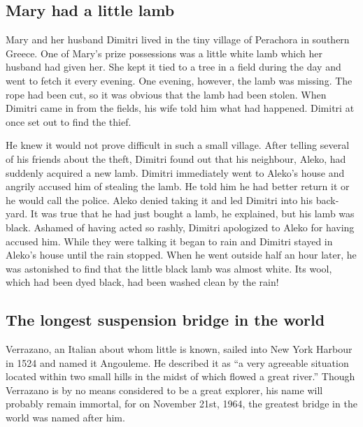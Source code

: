 \documentclass[11pt]{article}
\begin{document}
\subsection{Mary had a little lamb}
\label{sec-1-16}

Mary and her husband Dimitri lived in the tiny village of Perachora in southern Greece. One of Mary's prize possessions was a little white lamb which her husband had given her. She kept it tied to a tree in a field during the day and went to fetch it every evening. One evening, however, the lamb was missing. The rope had been cut, so it was obvious that the lamb had been stolen. When Dimitri came in from the fields, his wife told him what had happened. Dimitri at once set out to find the thief. 

He knew it would not prove difficult in such a small village. After telling several of his friends about the theft, Dimitri found out that his neighbour, Aleko, had suddenly acquired a new lamb. Dimitri immediately went to Aleko's house and angrily accused him of stealing the lamb. He told him he had better return it or he would call the police. Aleko denied taking it and led Dimitri into his back-yard. It was true that he had just bought a lamb, he explained, but his lamb was black. Ashamed of having acted so rashly, Dimitri apologized to Aleko for having accused him. While they were talking it began to rain and Dimitri stayed in Aleko's house until the rain stopped. When he went outside half an hour later, he was astonished to find that the little black lamb was almost white. Its wool, which had been dyed black, had been washed clean by the rain!
\subsection{The longest suspension bridge in the world}
\label{sec-1-17}

Verrazano, an Italian about whom little is known, sailed into New York Harbour in 1524 and named it Angouleme. He described it as ``a very agreeable situation located within two small hills in the midst of which flowed a great river.'' Though Verrazano is by no means considered to be a great explorer, his name will probably remain immortal, for on November 21st, 1964, the greatest bridge in the world was named after him. 
\end{document}
